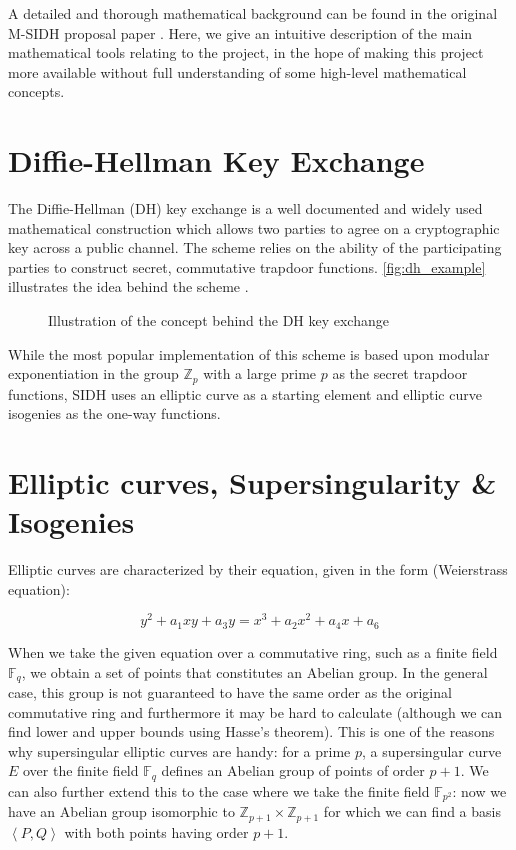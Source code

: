 \documentclass[a4paper,11pt,oneside]{report}
\newcommand{\zp}{$\mathbb{Z}_p$\xspace}
\newcommand{\Fq}{$\mathbb{F}_q$\xspace}
\begin{document}
A detailed and thorough mathematical background can be found in the original M-SIDH proposal paper \cite{msidh}. Here, we give an intuitive description of the main mathematical tools relating to the project, in the hope of making this project more available without full understanding of some high-level mathematical concepts.

\section{Diffie-Hellman Key Exchange}

    The Diffie-Hellman (DH) key exchange is a well documented and widely used mathematical construction which allows two parties to agree on a cryptographic key across a public channel. The scheme relies on the ability of the participating parties to construct secret, commutative trapdoor functions. \autoref{fig:dh_example} illustrates the idea behind the scheme \cite{dhmedia}.

    \begin{figure}[htp!]
        \centering
        
        \caption{Illustration of the concept behind the DH key exchange \cite{dhmedia}}
        \label{fig:dh_example}
    \end{figure}

    While the most popular implementation of this scheme is based upon modular exponentiation in the group \zp with a large prime $p$ as the secret trapdoor functions, SIDH uses an elliptic curve as a starting element and elliptic curve isogenies as the one-way functions. 

\section{Elliptic curves, Supersingularity \& Isogenies}

    Elliptic curves are characterized by their equation, given in the form (Weierstrass equation):

    \begin{equation}
        y^2 + a_1 x y + a_3 y = x^3 + a_2 x^2 + a_4 x + a_6
    \end{equation}

    When we take the given equation over a commutative ring, such as a finite field \Fq, we obtain a set of points that constitutes an Abelian group. In the general case, this group is not guaranteed to have the same order as the original commutative ring and furthermore it may be hard to calculate (although we can find lower and upper bounds using Hasse's theorem). This is one of the reasons why supersingular elliptic curves are handy: for a prime $p$, a supersingular curve $E$ over the finite field \Fq defines an Abelian group of points of order $p+1$. We can also further extend this to the case where we take the finite field $\mathbb{F}_{p^2}$: now we have an Abelian group isomorphic to $\mathbb{Z}_{p+1} \times \mathbb{Z}_{p+1}$ \cite{algorithms} for which we can find a basis $\left \langle P, Q \right \rangle$ with both points having order $p+1$.
\end{document}
